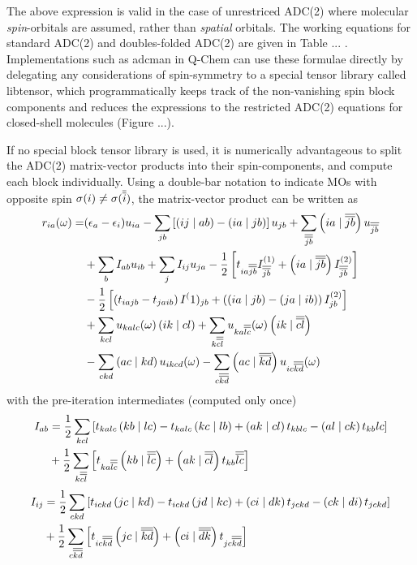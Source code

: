The above expression is valid in the case of unrestriced ADC(2) where molecular \emph{spin}-orbitals are assumed, rather than \emph{spatial} orbitals. The working equations for standard ADC(2) and doubles-folded ADC(2) are given in Table ... . Implementations such as adcman in Q-Chem can use these formulae directly by delegating any considerations of spin-symmetry to a special tensor library called libtensor, which programmatically keeps track of the non-vanishing spin block components and reduces the expressions to the restricted ADC(2) equations for closed-shell molecules (Figure ...).

If no special block tensor library is used, it is numerically advantageous to split the ADC(2) matrix-vector products into their spin-components, and compute each block individually. Using a double-bar notation to indicate MOs with opposite spin $\sigma(i) \neq \sigma(\overline{\overline{i}})$, the matrix-vector product can be written as
\begin{equation}
\begin{split}
r_{ia}( \omega) = &(\epsilon_a - \epsilon_i) u_{ia} - \sum_{jb} \left[ \left( ij \mid ab \right) - \left( ia \mid jb \right) \right] u_{jb} + \sum_{\overline{\overline{jb}}} \left( ia \mid \overline{\overline{jb}} \right) u_{\overline{\overline{jb}}} \\
&+ \sum_b I_{ab} u_{ib} + \sum_{j} I_{ij} u_{ja} - \frac{1}{2} \left[ t_{ia\overline{\overline{jb}}} I^{(1)}_{\overline{\overline{jb}}} + \left( ia \mid \overline{\overline{jb}} \right) I_{\overline{\overline{jb}}}^{(2)} \right] \\
&- \frac{1}{2} \left[ \left( t_{iajb} - t_{jaib} \right) I^(1)_{jb} + \left(\left( ia \mid jb \right) - \left( ja \mid ib \right) \right) I_{jb}^{(2)} \right] \\
&+ \sum_{kcl} u_{kalc}(\omega) \left( ik \mid cl \right) + \sum_{k\overline{\overline{cl}}} u_{ka\overline{\overline{lc}}}(\omega) \left( ik \mid \overline{\overline{cl}} \right) \\
&- \sum_{ckd} \left( ac \mid kd \right) u_{ikcd}(\omega) - \sum_{c\overline{\overline{kd}}} \left( ac \mid \overline{\overline{kd}} \right) u_{ic\overline{\overline{kd}}}(\omega)
\end{split}
\end{equation}  
\noindent with the pre-iteration intermediates (computed only once)
\begin{equation}
\begin{split}
I_{ab} &= \frac{1}{2} \sum_{kcl} \left[ t_{kalc} \left( kb \mid lc \right) - t_{kalc} \left( kc \mid lb \right) + \left( ak \mid cl \right) t_{kblc} - \left( al \mid ck \right) t_{kb}{lc} \right] \\
&+ \frac{1}{2} \sum_{k\overline{\overline{cl}}} \left[ t_{ka\overline{\overline{lc}}} \left( kb \mid \overline{\overline{lc}} \right) + \left( ak \mid \overline{\overline{cl}} \right) t_{kb}{\overline{\overline{lc}}} \right] 
\end{split}
\end{equation}
\begin{equation}
\begin{split}
I_{ij} &= \frac{1}{2} \sum_{ckd} \left[ t_{ickd} \left( jc \mid kd \right) - t_{ickd} \left( jd \mid kc \right) + \left( ci \mid dk \right) t_{jckd} - \left( ck \mid di \right) t_{jckd} \right] \\
&+ \frac{1}{2} \sum_{c\overline{\overline{kd}}} \left[ t_{ic\overline{\overline{kd}}} \left( jc \mid \overline{\overline{kd}} \right) + \left( ci \mid \overline{\overline{dk}} \right) t_{jc\overline{\overline{kd}}} \right]  
\end{split}
\end{equation}
